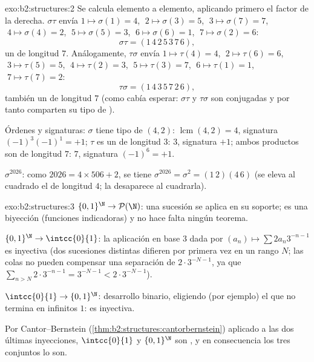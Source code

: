 \begin{solution}{exo:b2:structures:2}
Se calcula elemento a elemento, aplicando primero el factor de la
derecha. $\sigma\tau$ envía $1 \mapsto \sigma(1) = 4$, $\;2 \mapsto
\sigma(3) = 5$, $\;3 \mapsto \sigma(7) = 7$, $\;4 \mapsto \sigma(4) =
2$, $\;5 \mapsto \sigma(5) = 3$, $\;6 \mapsto \sigma(6) = 1$, $\;7
\mapsto \sigma(2) = 6$:
\[
\sigma\tau = (1\,4\,2\,5\,3\,7\,6),
\]
un  de longitud $7$. Análogamente, $\tau\sigma$ envía $1 \mapsto
\tau(4) = 4$, $\;2 \mapsto \tau(6) = 6$, $\;3 \mapsto \tau(5) = 5$,
$\;4 \mapsto \tau(2) = 3$, $\;5 \mapsto \tau(3) = 7$, $\;6 \mapsto
\tau(1) = 1$, $\;7 \mapsto \tau(7) = 2$:
\[
\tau\sigma = (1\,4\,3\,5\,7\,2\,6),
\]
también un  de longitud $7$ (como cabía esperar: $\sigma\tau$ y
$\tau\sigma$ son conjugadas y por tanto comparten su tipo de
).

Órdenes y signaturas: $\sigma$ tiene tipo de  $(4,2)$: 
$\operatorname{lcm}(4,2) = 4$, signatura $(-1)^3(-1)^1 = +1$; $\tau$
es un  de longitud $3$:  $3$, signatura $+1$; ambos
productos son  de longitud $7$:  $7$, signatura $(-1)^6 =
+1$.

$\sigma^{2026}$: como $2026 = 4 \times 506 + 2$, se tiene
$\sigma^{2026} = \sigma^2 = (1\,2)(4\,6)$ (se eleva al cuadrado el
 de longitud $4$; la  desaparece al cuadrarla).
\end{solution}

\begin{solution}{exo:b2:structures:3}
$\{0,1\}^{\N} \to \mathcal{P}(\N)$: una sucesión se aplica en su
soporte; es una biyección (funciones indicadoras) y no hace falta
ningún teorema.

$\{0,1\}^{\N} \to \intcc{0}{1}$: la aplicación en base $3$ dada por
$(a_n) \mapsto \sum 2a_n 3^{-n-1}$ es inyectiva (dos sucesiones
distintas difieren por primera vez en un rango $N$; las colas no
pueden compensar una separación de $2\cdot 3^{-N-1}$, ya que
$\sum_{n > N} 2\cdot 3^{-n-1} = 3^{-N-1} < 2\cdot3^{-N-1}$).

$\intcc{0}{1} \to \{0,1\}^{\N}$: desarrollo binario, eligiendo (por
ejemplo) el que no termina en infinitos $1$: es inyectiva.

Por Cantor--Bernstein (\cref{thm:b2:structures:cantorbernstein})
aplicado a las dos últimas inyecciones, $\intcc{0}{1}$ y
$\{0,1\}^{\N}$ son , y en consecuencia los tres
conjuntos lo son.
\end{solution}

